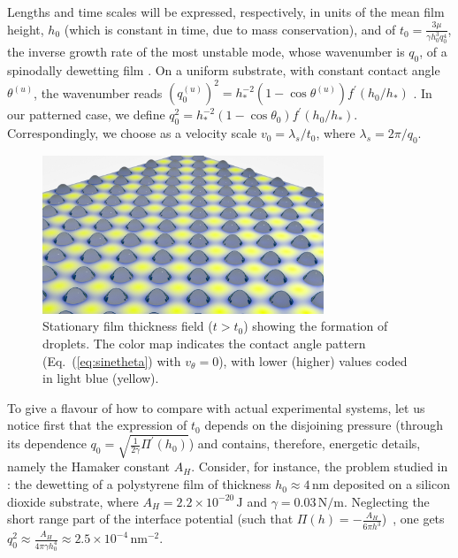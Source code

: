 Lengths and time scales will be expressed, respectively, in units of the mean film height, $h_0$ (which is constant in time, due to mass conservation), and of $t_0 = \frac{3\mu}{\gamma h_0^3 q_0^4}$, the inverse growth rate of the most unstable mode, whose wavenumber is $q_0$, of a spinodally dewetting film \cite{Mecke_2005}. On a uniform substrate, with constant contact angle $\theta^{(u)}$, the wavenumber reads 
$(q^{(u)}_0)^2 = h_{\ast}^{-2}(1-\cos \theta^{(u)})f^{\prime}(h_0/h_{\ast})$ \cite{Mecke_2005,PhysRevE.100.023108}. In our patterned case, we define 
  $q_0^2=h_{\ast}^{-2}(1-\cos\theta_0)f^{\prime}(h_0/h_{\ast})$. Correspondingly, we choose as a velocity scale $v_0 = \lambda_s/t_0$, where
$\lambda_s = 2\pi/q_0$.
\begin{figure}
    \centering
    \includegraphics[width=0.75\textwidth]{graphics/Figure_1.png}
    \caption{Stationary film thickness field ($t>t_0$) showing the formation of droplets. The color map indicates the contact angle pattern 
    (Eq.~(\ref{eq:sinetheta}) with $v_{\theta}=0$), with lower (higher) values coded in light blue (yellow).
    }
    \label{fig:handtheta}
\end{figure}
To give a flavour of how to compare with actual experimental systems, let us notice
first that the expression of $t_0$ depends on the disjoining pressure (through its dependence 
 $q_0 = \sqrt{\frac{1}{2\gamma} \Pi^{\prime}(h_0)}$) and contains, therefore, energetic details, namely 
 the Hamaker constant $A_H$. Consider, for instance, the problem studied in \cite{becker2003complex}: the dewetting of a polystyrene film of thickness $h_0 \approx 4 \, \text{nm}$ deposited on a silicon 
dioxide substrate, where $A_H  = 2.2 \times 10^{-20} \, \text{J}$ and 
$\gamma = 0.03 \, \text{N}/\text{m}$. Neglecting the short range part of the interface potential
(such that $\Pi(h)= - \frac{A_H}{6\pi h^3}$)~\cite{Mecke_2005,becker2003complex}, one gets 
$q_0^2 \approx \frac{A_H}{4\pi \gamma h_0^4} \approx 2.5 \times 10^{-4} \, \text{nm}^{-2}$.
